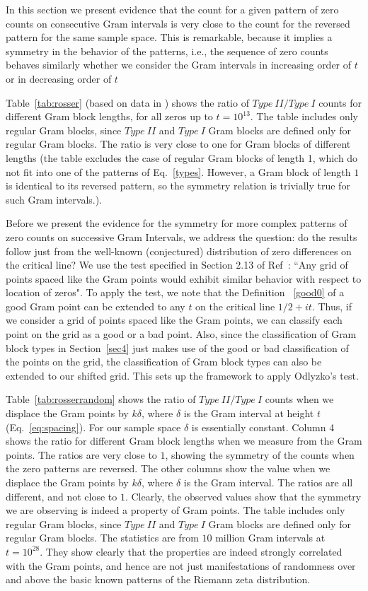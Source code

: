 \documentclass[twoside]{article}
\theoremstyle{definition}
\begin{document}
In this section we present evidence that the count for
a given pattern of zero counts on consecutive Gram intervals is very close to the count for the reversed pattern for the same sample space. This is remarkable, because it implies a symmetry in the behavior of the patterns, i.e., the  sequence of zero counts behaves similarly whether we consider the Gram intervals in increasing order of $t$ or in decreasing order of $t$

Table~\ref{tab:rosser}  (based on data in \cite{gourdon}) shows the ratio of $Type~II/Type~I$ counts for different Gram block lengths, for all zeros up to $t = 10^{13}$. The table includes only regular Gram blocks, since $Type~II$ and $Type~I$ Gram blocks are defined only for regular Gram blocks. The ratio is very close to one for Gram blocks of different lengths (the table excludes the case of regular Gram blocks of length 1, which do not fit into one of the patterns of Eq.~\ref{types}. However, a Gram block 
of length $1$ is identical to its reversed pattern, so the symmetry relation is trivially true for such Gram intervals.).   

Before we present the evidence for the symmetry for more complex patterns of zero counts on successive Gram Intervals, we address the question: do the results follow just from the well-known (conjectured) distribution of zero differences on the critical line? We use the test specified in Section 2.13 of Ref~\cite{Odlyzko 1992}: ``Any grid of points spaced like the Gram points would exhibit similar behavior with respect to location of zeros". 
To apply the test, we note  that the Definition ~\ref{good0} of a good Gram point can be extended to any $t$ on the critical line $1/2+it$. Thus, if we consider a  grid of points spaced like the Gram points, we can classify each point on the grid as a good or a bad point. Also, since the classification of Gram block types in Section~\ref{sec4} just makes use of the good or bad classification of the points on the grid, the classification of Gram block types can also be extended to our shifted grid. This sets up the framework to apply Odlyzko's test.

Table~\ref{tab:rosserrandom}  shows the ratio of $Type~II/Type~I$ counts when we displace the Gram points by $k\delta$, where $\delta$ is the Gram interval at height $t$ (Eq.~\ref{eq:spacing}). For our sample space $\delta$ is essentially constant.  Column 4 shows the ratio for different Gram block lengths when we measure from the Gram points. The ratios are very close to  $1$, showing the symmetry of the counts when the zero patterns are reversed. The other columns show the value  when we displace the Gram points by $k\delta$, where $\delta$ is the Gram interval.  The ratios are all different, and not close to $1$. Clearly, the observed values show that the symmetry we are observing is indeed a property of Gram points. The table includes only regular Gram blocks, since $Type~II$ and $Type~I$ Gram blocks are defined only for regular Gram blocks.  The statistics are from $10$ million Gram intervals at $t=10^{28}$. 
They  show clearly that the properties are indeed strongly correlated with the Gram points, and hence are not just manifestations of randomness over and above the basic known patterns of the Riemann zeta distribution. 
\end{document}
